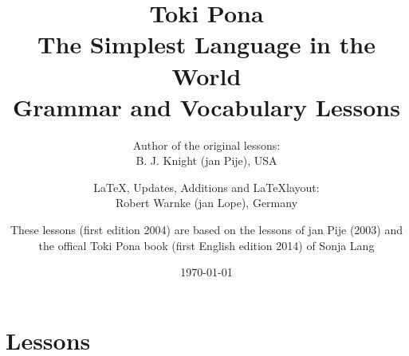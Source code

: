 \documentclass[a4paper, 10pt]{book}
\begin{document}
\setlength{\topmargin}{-19mm}
\setlength{\headheight}{5mm}
\setlength{\headsep}{10mm}
\setlength{\textheight}{245mm}
\setlength{\textwidth}{155mm}
\setlength{\oddsidemargin}{5mm}
\setlength{\evensidemargin}{-1mm}
\setlength{\footskip}{20mm}
\setlength{\parindent}{0mm}
\setlength{\parskip}{2.0ex plus 1.0ex minus 0.5ex}

\title{
    Toki Pona \\
    The Simplest Language in the World \\
    Grammar and Vocabulary Lessons \\
}
\author{
    Author of the original lessons: \\ B. J. Knight (jan Pije), USA \cite{www:Pije:01} \\
    \and
    \LaTeX, Updates, Additions and \LaTeX layout: \\ Robert Warnke (jan Lope), Germany \cite{www:rowa:01} \\
    \and
    These lessons (first edition 2004) are based on the lessons of jan Pije (2003) and \\
    the offical Toki Pona book (first English edition 2014) of Sonja Lang \cite{www:tokipona.org}
}

%
\date
\today
\maketitle
\tableofcontents

\chapter{Lessons}






















%
\appendix
\end{document}
